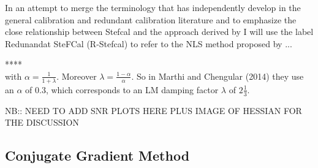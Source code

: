 \documentclass[useAMS,usenatbib]{mn2e}
\begin{document}
In an attempt to merge the terminology that has independently develop in the general calibration and redundant calibration literature and to emphasize the close
relationship between Stefcal and the approach derived by I will use the label Redunandat SteFCal (R-Stefcal) to refer to the NLS method proposed by ... 

****\\

with $\alpha = \frac{1}{1+\lambda}$. Moreover $\lambda = \frac{1-\alpha}{\alpha}$. So in Marthi and Chengular (2014) they use an $\alpha$ of 0.3, which corresponds to an LM damping factor $\lambda$
of $2\frac{1}{3}$.

NB:: NEED TO ADD SNR PLOTS HERE
PLUS IMAGE OF HESSIAN FOR THE DISCUSSION

\subsection{Conjugate Gradient Method}
\end{document}
